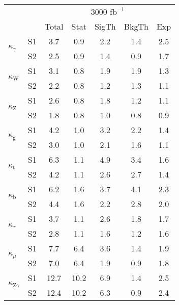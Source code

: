 \begin{tabular}{@{} l c c@{\hskip 0.15in} c c c c @{}}
  \hline
  &  & \multicolumn{5}{c}{3000 $\text{fb}^{-1}$} \\
  &  & Total & Stat & SigTh & BkgTh & Exp \\
  \hline
  \multirow{2}{*}{$\kappa_{\gamma }$} & S1 & 3.7   & 0.9   & 2.2   & 1.4   & 2.5  \\[1pt] 
  & S2 & 2.5   & 0.9   & 1.4   & 0.9   & 1.7  \\[4pt] 
  \multirow{2}{*}{$\kappa_{\mathrm{W}}$} & S1  & 3.1   & 0.8   & 1.9   & 1.9   & 1.3  \\[1pt]
  & S2  & 2.2   & 0.8   & 1.2   & 1.3   & 1.1  \\[4pt]
  \multirow{2}{*}{$\kappa_{\mathrm{Z}}$} & S1  & 2.6   & 0.8   & 1.8   & 1.2   & 1.1  \\[1pt]
  & S2  & 1.8   & 0.8   & 1.0   & 0.8   & 0.9  \\[4pt]
  \multirow{2}{*}{$\kappa_{\mathrm{g}}$} & S1 & 4.2   & 1.0   & 3.2   & 2.2   & 1.4  \\[1pt]
  & S2 & 3.0   & 1.0   & 2.1   & 1.6   & 1.1  \\[4pt]
  \multirow{2}{*}{$\kappa_{\mathrm{t}}$} & S1 & 6.3   & 1.1   & 4.9   & 3.4   & 1.6  \\[1pt]
  & S2  & 4.2   & 1.1   & 2.6   & 2.7   & 1.4  \\[4pt]
  \multirow{2}{*}{$\kappa_{\mathrm{b}}$} & S1 & 6.2   & 1.6   & 3.7   & 4.1   & 2.3  \\[1pt]
  & S2  & 4.4   & 1.6   & 2.2   & 2.8   & 2.0  \\[4pt]
  \multirow{2}{*}{$\kappa_{\tau }$} & S1 & 3.7   & 1.1   & 2.6   & 1.8   & 1.7  \\[1pt]
  & S2  & 2.8   & 1.1   & 1.6   & 1.2   & 1.6  \\[4pt]
  \multirow{2}{*}{$\kappa_{\mu}$} & S1  & 7.7   & 6.4   & 3.6   & 1.4   & 1.9  \\[1pt]
  & S2  & 7.0   & 6.4   & 1.9   & 0.9   & 1.8  \\[4pt]
  \multirow{2}{*}{$\kappa_{\mathrm{Z}\gamma}$} & S1 & 12.7  & 10.2  & 6.9   & 1.4   & 2.5  \\[1pt] 
  & S2  & 12.4  & 10.2  & 6.3   & 0.9   & 2.4  \\[4pt]
  \hline
\end{tabular}
